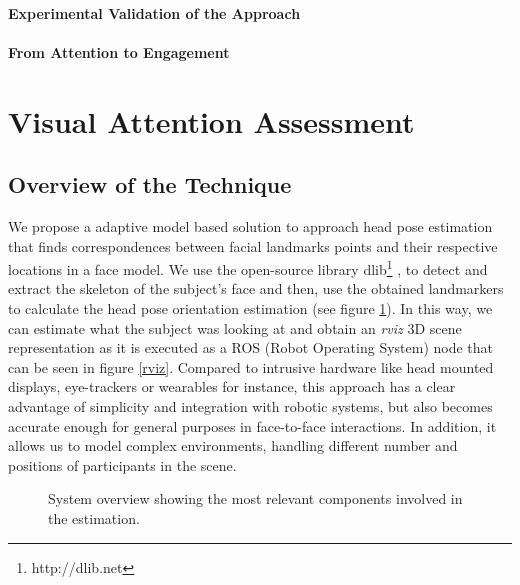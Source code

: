 \documentclass{sig-alternate}
\begin{document}


\paragraph{Experimental Validation of the Approach}


\paragraph{From Attention to Engagement}


\section{Visual Attention Assessment}

\subsection{Overview of the Technique}

We propose a adaptive model based solution to approach head pose estimation that
finds correspondences between facial landmarks points and their respective
locations in a face model. We use the open-source library
dlib\footnote{http://dlib.net} \cite{dlib09}, to detect and extract the skeleton
of the subject's face and then, use the obtained landmarkers to calculate the
head pose orientation estimation (see figure \ref{system}). In this way, we can
estimate what the subject was looking at and obtain an \textit{rviz} 3D scene
representation as it is executed as a ROS (Robot Operating System) node that can
be seen in figure \ref{rviz}. Compared to intrusive hardware like head mounted
displays, eye-trackers or wearables for instance, this approach has a clear
advantage of simplicity and integration with robotic systems, but also becomes
accurate enough for general purposes in face-to-face interactions. In addition,
it allows us to model complex environments, handling different number and
positions of participants in the scene.

\begin{figure}[h!]
    \centering
    \caption{\small System overview showing the most relevant components involved in the estimation.}
    \label{system}
\end{figure}
\end{document}
